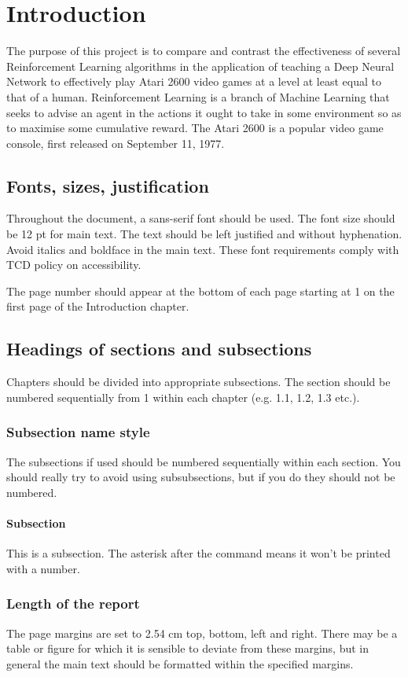 \chapter{Introduction}
The purpose of this project is to compare and contrast the effectiveness of several Reinforcement Learning algorithms in the application of teaching a Deep Neural Network
to effectively play Atari 2600 video games at a level at least equal to that of a human. Reinforcement Learning is a branch of Machine Learning that seeks to advise an
agent in the actions it ought to take in some environment so as to maximise some cumulative reward. The Atari 2600 is a popular video game console, first released on September 11, 1977.

\section{Fonts, sizes, justification}

Throughout the document, a sans-serif font should be used. The font size should be 12 pt for main text. The text should be left justified and without hyphenation. Avoid italics and boldface in the main text. These font requirements comply with TCD policy on accessibility.

The page number should appear at the bottom of each page starting at 1 on the first page of the Introduction chapter. 

\section{Headings of sections and subsections}
Chapters should be divided into appropriate subsections. The section should be numbered sequentially from 1 within each chapter (e.g. 1.1, 1.2, 1.3 etc.).

\subsection{Subsection name style}
The subsections if used should be numbered sequentially within each section. You should really try to avoid using subsubsections, but if you do they should not be numbered.

\subsubsection*{Subsection}
This is a subsection. The asterisk after the command means it won't be printed with a number.

\subsection{Length of the report}
The page margins are set to 2.54 cm top, bottom, left and right. There may be a table or figure for which it is sensible to deviate from these margins, but in general the main text should be formatted within the specified margins.

